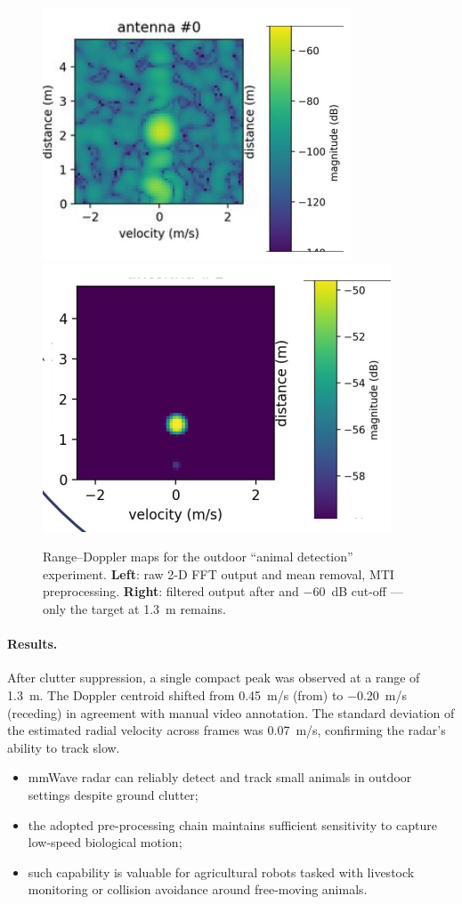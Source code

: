 \begin{figure}[H]
    \centering
    \includegraphics[width=0.48\linewidth]{Src/images/chiken_raw.png}\hfill
    \includegraphics[width=0.48\linewidth]{Src/images/chiken_cut.png}
    \caption{Range–Doppler maps for the outdoor “animal detection” experiment.  
    \textbf{Left}: raw 2-D FFT output and mean removal, MTI preprocessing.  
    \textbf{Right}: filtered output after and \SI{-60}{dB} cut-off — only the target at \SI{1.3}{m} remains.}
    \label{fig:chicken_rd}
\end{figure}



\paragraph{Results.}
After clutter suppression, a single compact peak was observed at a range of \SI{1.3}{m}.  
The Doppler centroid shifted from \SI{+0.45}{m/s} (from) to \SI{-0.20}{m/s} (receding) in agreement with manual video annotation.  The standard deviation of the estimated radial velocity across frames was \SI{0.07}{m/s}, confirming the radar’s ability to track slow.


\begin{itemize}
    \item mmWave radar can reliably detect and track small animals in outdoor settings despite ground clutter;
    \item the adopted pre-processing chain maintains sufficient sensitivity to capture low-speed biological motion;
    \item such capability is valuable for agricultural robots tasked with livestock monitoring or collision avoidance around free-moving animals.
\end{itemize}


